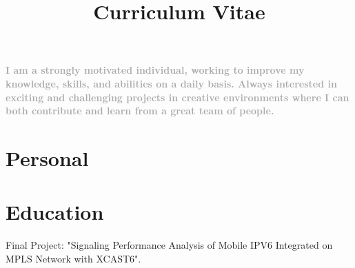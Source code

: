 \documentclass[10pt, a4paper]{moderncv}
\title{Curriculum Vitae}
\begin{document}
\maketitle

\begin{small}
\textcolor{darkgray}{
\textbf{I am a strongly motivated individual, working to improve my knowledge, skills, and abilities
on a daily basis. Always interested in exciting and challenging projects in creative environments
where I can both contribute and learn from a great team of people.}}
\end{small}


\section{Personal}


\section{Education}
{
    \begin{scriptsize}
    Final Project: "Signaling Performance Analysis of Mobile IPV6 Integrated on MPLS Network with XCAST6".\\
    \end{scriptsize}
}


\end{document}
